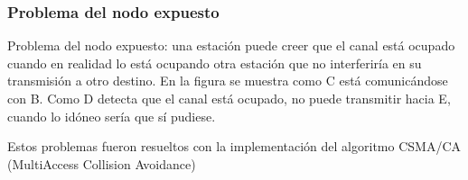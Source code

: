 \documentclass[a4paper]{article}
\begin{document}
	\noindent{}
	
	\subsubsection*{Problema del nodo expuesto}
	
	Problema del nodo expuesto: una estación puede creer que el canal está ocupado cuando en realidad lo está ocupando otra estación que no interferiría en su transmisión a otro destino. En la figura se muestra como C está comunicándose con B. Como D detecta que el canal está ocupado, no puede transmitir hacia E, cuando lo idóneo sería que sí pudiese.
	
	\noindent{}
	
	Estos problemas fueron resueltos con la implementación del algoritmo CSMA/CA (MultiAccess Collision Avoidance) 
	
\end{document}
